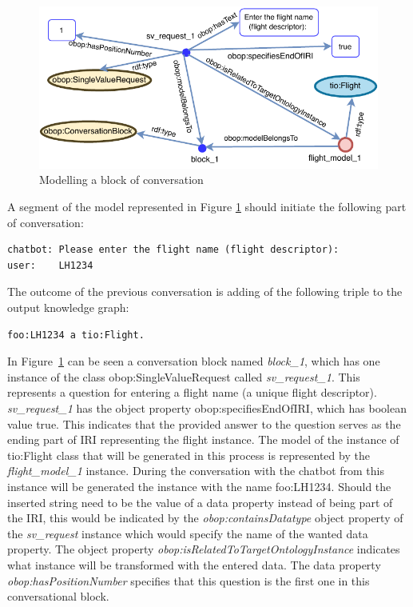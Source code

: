 \documentclass[runningheads]{llncs}
\begin{document}
\begin{figure}[H]
  \centering
  \includegraphics[width=\linewidth]{img/conversation_block}
  \caption{Modelling a block of conversation}
  \label{fig:conv_block}
\end{figure}


A segment of the model represented in Figure \ref{fig:conv_block} should initiate the following part of conversation:
\begin{lstlisting}[basicstyle=\small,  xleftmargin=0.7cm ]
chatbot: Please enter the flight name (flight descriptor):
user:    LH1234
\end{lstlisting}
The outcome of the previous conversation is adding of the following triple to the output knowledge graph:
\begin{lstlisting}[basicstyle=\small,  xleftmargin=0.7cm ]
foo:LH1234 a tio:Flight. 
\end{lstlisting}
In Figure~\ref{fig:conv_block} can be seen a conversation block named \textit{block\_1}, which has one instance of the class obop:SingleValueRequest called \textit{sv\_request\_1}. This represents a question for entering a flight name (a unique flight descriptor). \textit{sv\_request\_1} has the object property obop:specifiesEndOfIRI, which has boolean value true. This indicates that the provided answer to the question serves as the ending part of IRI representing the flight instance. The model of the instance of tio:Flight class that will be generated in this process is represented by the \textit{flight\_model\_1} instance. During the conversation with the chatbot from this instance will be generated the instance with the name foo:LH1234. Should the inserted string need to be the value of a data property instead of being part of the IRI, this would be indicated by the \textit{obop:containsDatatype} object property of the \textit{sv\_request} instance which would specify the name of the wanted data property. The object property \textit{obop:isRelatedToTargetOntologyInstance} indicates what instance will be transformed with the entered data. The data property \textit{obop:hasPositionNumber} specifies that this question is the first one in this conversational block.  
\end{document}
